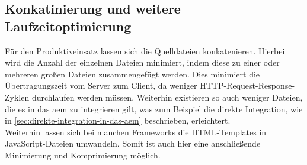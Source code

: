 \subsection{Konkatinierung und weitere Laufzeitoptimierung}
\label{sec:konkat}
Für den Produktiveinsatz lassen sich die Quelldateien konkatenieren. Hierbei wird die Anzahl der einzelnen Dateien minimiert, indem diese zu einer oder mehreren großen Dateien zusammengefügt werden. Dies minimiert die Übertragungszeit vom Server zum Client, da weniger HTTP-Request-Response-Zyklen durchlaufen werden müssen. Weiterhin existieren so auch weniger Dateien, die es in das \ac{aem} zu integrieren gilt, was zum Beispiel die direkte Integration, wie in \autoref{sec:direkte-integration-in-das-aem} beschrieben, erleichtert. \\
Weiterhin lassen sich bei manchen Frameworks die HTML-Templates in JavaScript-Dateien umwandeln. Somit ist auch hier eine anschließende Minimierung und Komprimierung möglich.


